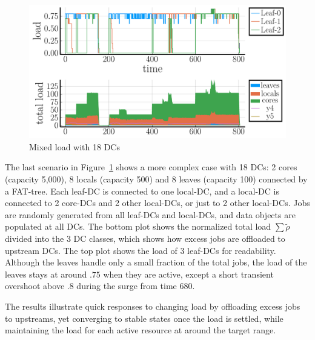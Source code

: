 

\begin{figure}[tb]
  \centering
  \includegraphics[width=\columnwidth]{18nodes.pdf}
  \vspace{-2.0ex}
  \caption{Mixed load with 18 DCs}
  \label{fig:18nodes}
\end{figure}

The last scenario in Figure~\ref{fig:18nodes} shows a more complex case with
18 DCs: 2 cores (capacity 5,000), 8 locals (capacity 500) and 8 leaves
(capacity 100) connected by a FAT-tree.
Each leaf-DC is connected to one local-DC, and a local-DC is connected to
2 core-DCs and 2 other local-DCs, or just to 2 other local-DCs.
Jobs are randomly generated from all leaf-DCs and local-DCs, and data
objects are populated at all DCs.
The bottom plot shows the normalized total load $\sum \tilde{\rho}$
divided into the 3 DC classes, which shows how excess jobs are
offloaded to upstream DCs.
The top plot shows the load of 3 leaf-DCs for readability.
Although the leaves handle only a small fraction of the total jobs,
the load of the leaves stays at around $.75$ when they are
active, except a short transient overshoot above $.8$ during the
surge from time 680.

The results illustrate quick responses to changing load
by offloading excess jobs to upstreams,
yet converging to stable states once the load is settled,
while maintaining the load for each active resource at around the target
range.


